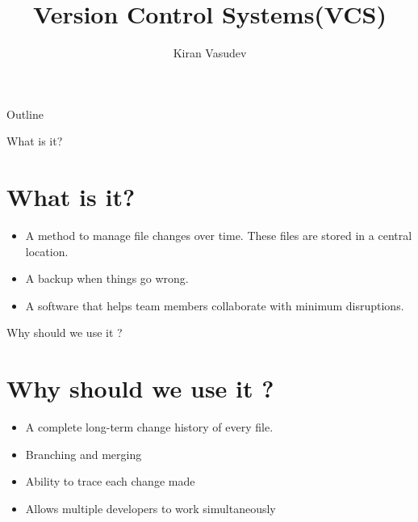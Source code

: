 \documentclass{beamer}
\title{Version Control Systems(VCS)}
\author{Kiran Vasudev\inst{1}}
\institute[Universities of Somewhere and Elsewhere] 
{
  \inst{1}
  Hochschule Bonn-Rhein-Sieg

}
\begin{document}
\begin{frame}
  \titlepage
\end{frame}

\begin{frame}{Outline}
  \tableofcontents
\end{frame}

\begin{frame}{What is it?}
\section{What is it?}
  \begin{itemize}
  \item {
    A method to manage file changes over time. These files are stored in a central location.
  }
  \item {
    A backup when things go wrong.
  }
  \item{A software that helps team members collaborate with minimum disruptions.}
  \end{itemize}
\end{frame}

\begin{frame}{Why should we use it ?}
\section{Why should we use it ?}
  \begin{itemize}
  \item {
    A complete long-term change history of every file.
  }
  \item {   
    Branching and merging
  }
  \item {   
    Ability to trace each change made
  }
  \item {   
	Allows multiple developers to work simultaneously
  }
  \end{itemize}
\end{frame}
\end{document}

